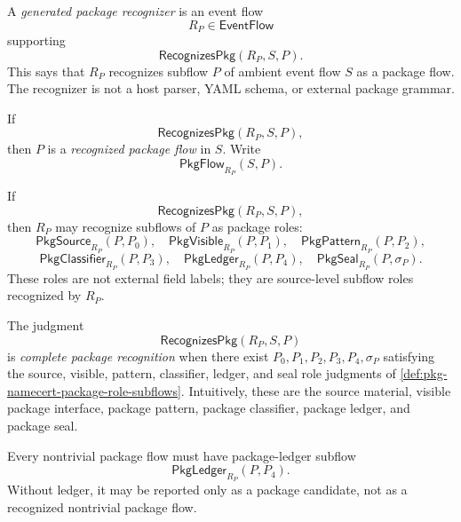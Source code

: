 \begin{definition}
\label{def:pkg-namecert-generated-package-recognizer}
A \emph{generated package recognizer} is an event flow
$$
  R_P\in\mathsf{EventFlow}
$$
supporting
$$
  \mathsf{RecognizesPkg}(R_P,S,P).
$$
This says that $R_P$ recognizes subflow $P$ of ambient event flow $S$ as a package flow. The recognizer is not a host parser, YAML schema, or external package grammar.
\end{definition}

\begin{definition}
\label{def:pkg-namecert-recognized-package-flow}
If
$$
  \mathsf{RecognizesPkg}(R_P,S,P),
$$
then $P$ is a \emph{recognized package flow} in $S$. Write
$$
  \mathsf{PkgFlow}_{R_P}(S,P).
$$
\end{definition}

\begin{definition}
\label{def:pkg-namecert-package-role-subflows}
If
$$
  \mathsf{RecognizesPkg}(R_P,S,P),
$$
then $R_P$ may recognize subflows of $P$ as package roles:
$$
  \mathsf{PkgSource}_{R_P}(P,P_0),
  \quad
  \mathsf{PkgVisible}_{R_P}(P,P_1),
  \quad
  \mathsf{PkgPattern}_{R_P}(P,P_2),
$$
$$
  \mathsf{PkgClassifier}_{R_P}(P,P_3),
  \quad
  \mathsf{PkgLedger}_{R_P}(P,P_4),
  \quad
  \mathsf{PkgSeal}_{R_P}(P,\sigma_P).
$$
These roles are not external field labels; they are source-level subflow roles recognized by $R_P$.
\end{definition}

\begin{definition}
\label{def:pkg-namecert-complete-package-recognition}
The judgment
$$
  \mathsf{RecognizesPkg}(R_P,S,P)
$$
is \emph{complete package recognition} when there exist $P_0,P_1,P_2,P_3,P_4,\sigma_P$ satisfying the source, visible, pattern, classifier, ledger, and seal role judgments of \autoref{def:pkg-namecert-package-role-subflows}. Intuitively, these are the source material, visible package interface, package pattern, package classifier, package ledger, and package seal.
\end{definition}

\begin{principle}
\label{prin:pkg-namecert-no-package-without-ledger}
Every nontrivial package flow must have package-ledger subflow
$$
  \mathsf{PkgLedger}_{R_P}(P,P_4).
$$
Without ledger, it may be reported only as a package candidate, not as a recognized nontrivial package flow.
\end{principle}

